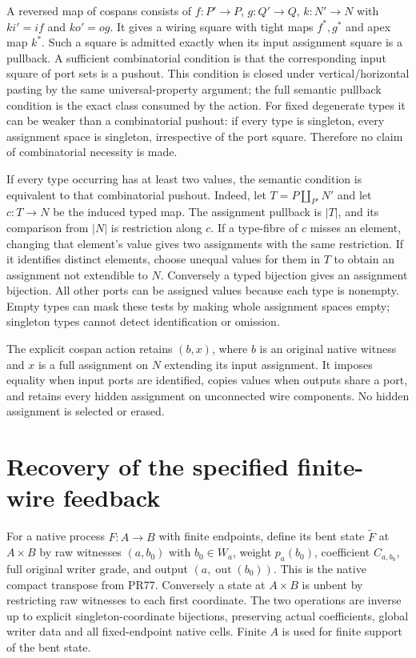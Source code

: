 \documentclass{article}
\begin{document}
A reversed map of cospans consists of $f:P'\to P$, $g:Q'\to Q$, $k:N'\to N$ with $ki'=if$ and $ko'=og$. It gives a wiring square with tight maps $f^*,g^*$ and apex map $k^*$. Such a square is admitted exactly when its input assignment square is a pullback. A sufficient combinatorial condition is that the corresponding input square of port sets is a pushout. This condition is closed under vertical/horizontal pasting by the same universal-property argument; the full semantic pullback condition is the exact class consumed by the action. For fixed degenerate types it can be weaker than a combinatorial pushout: if every type is singleton, every assignment space is singleton, irrespective of the port square. Therefore no claim of combinatorial necessity is made.

If every type occurring has at least two values, the semantic condition is equivalent to that combinatorial pushout. Indeed, let $T=P\amalg_{P'}N'$ and let $c:T\to N$ be the induced typed map. The assignment pullback is $|T|$, and its comparison from $|N|$ is restriction along $c$. If a type-fibre of $c$ misses an element, changing that element's value gives two assignments with the same restriction. If it identifies distinct elements, choose unequal values for them in $T$ to obtain an assignment not extendible to $N$. Conversely a typed bijection gives an assignment bijection. All other ports can be assigned values because each type is nonempty. Empty types can mask these tests by making whole assignment spaces empty; singleton types cannot detect identification or omission.

The explicit cospan action retains $(b,x)$, where $b$ is an original native witness and $x$ is a full assignment on $N$ extending its input assignment. It imposes equality when input ports are identified, copies values when outputs share a port, and retains every hidden assignment on unconnected wire components. No hidden assignment is selected or erased.

\section{Recovery of the specified finite-wire feedback}
For a native process $F:A\to B$ with finite endpoints, define its bent state $\widetilde F$ at $A\times B$ by raw witnesses $(a,b_0)$ with $b_0\in W_a$, weight $p_a(b_0)$, coefficient $C_{a,b_0}$, full original writer grade, and output $(a,\operatorname{out}(b_0))$. This is the native compact transpose from PR77. Conversely a state at $A\times B$ is unbent by restricting raw witnesses to each first coordinate. The two operations are inverse up to explicit singleton-coordinate bijections, preserving actual coefficients, global writer data and all fixed-endpoint native cells. Finite $A$ is used for finite support of the bent state.
\end{document}
